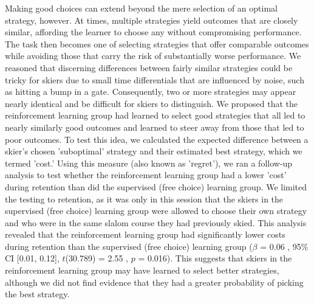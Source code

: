 \documentclass[pdflatex,sn-mathphys-num]{sn-jnl}%
\theoremstyle{thmstyleone}%
\theoremstyle{thmstyletwo}%
\theoremstyle{thmstylethree}%
\begin{document}
Making good choices can extend beyond the mere selection of an optimal strategy, however. At times, multiple strategies yield outcomes that are closely similar, affording the learner to choose any without compromising performance. The task then becomes one of selecting strategies that offer comparable outcomes while avoiding those that carry the risk of substantially worse performance. We reasoned that discerning differences between fairly similar strategies could be tricky for skiers due to small time differentials that are influenced by noise, such as hitting a bump in a gate. Consequently, two or more strategies may appear nearly identical and be difficult for skiers to distinguish. We proposed that the reinforcement learning group had learned to select good strategies that all led to nearly similarly good outcomes and learned to steer away from those that led to poor outcomes. To test this idea, we calculated the expected difference between a skier's chosen 'suboptimal' strategy and their estimated best strategy, which we termed 'cost.' Using this measure (also known as 'regret'), we ran a follow-up analysis to test whether the reinforcement learning group had a lower 'cost' during retention than did the supervised (free choice) learning group. We limited the testing to retention, as it was only in this session that the skiers in the supervised (free choice) learning group were allowed to choose their own strategy and who were in the same slalom course they had previously skied. This analysis revealed that the reinforcement learning group had significantly lower costs during retention than the supervised (free choice) learning group ($\beta$ = 0.06 , 95\% CI [0.01, 0.12], $t$(30.789) = 2.55 , $p$ = 0.016). This suggests that skiers in the reinforcement learning group may have learned to select better strategies, although we did not find evidence that they had a greater probability of picking the best strategy.
\end{document}
